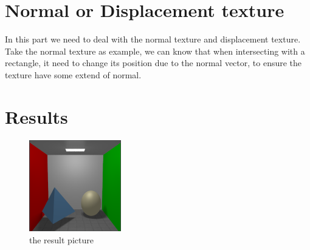 \documentclass[acmtog]{acmart}
\begin{document}
\section{Normal or Displacement texture}

In this part we need to deal with the normal texture and displacement texture. \\
Take the normal texture as example, we can know that when intersecting with a rectangle, it need to change its position due to the normal vector, to ensure the texture have some extend of normal.

\section{Results}
\begin{figure}[h]
\includegraphics[width=4cm,height=4cm]{result}
\caption{the result picture}
\end{figure}
\end{document}
